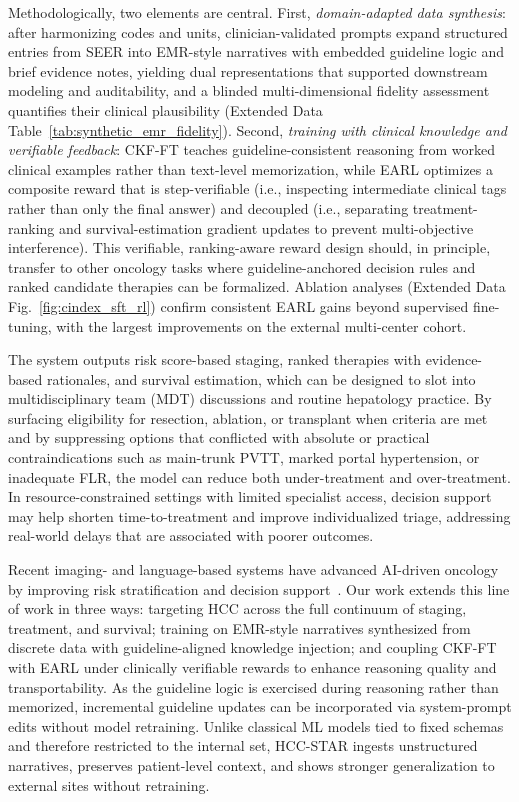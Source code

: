 \documentclass{article}
\begin{document}
Methodologically, two elements are central. First, \emph{domain-adapted data synthesis}: after harmonizing codes and units, clinician-validated prompts expand structured entries from SEER into EMR-style narratives with embedded guideline logic and brief evidence notes, yielding dual representations that supported downstream modeling and auditability, and a blinded multi-dimensional fidelity assessment quantifies their clinical plausibility (Extended Data Table~\ref{tab:synthetic_emr_fidelity}). Second, \emph{training with clinical knowledge and verifiable feedback}: CKF-FT teaches guideline-consistent reasoning from worked clinical examples rather than text-level memorization, while EARL optimizes a composite reward that is step-verifiable (i.e., inspecting intermediate clinical tags rather than only the final answer) and decoupled (i.e., separating treatment-ranking and survival-estimation gradient updates to prevent multi-objective interference). This verifiable, ranking-aware reward design should, in principle, transfer to other oncology tasks where guideline-anchored decision rules and ranked candidate therapies can be formalized. Ablation analyses (Extended Data Fig.~\ref{fig:cindex_sft_rl}) confirm consistent EARL gains beyond supervised fine-tuning, with the largest improvements on the external multi-center cohort.

The system outputs risk score-based staging, ranked therapies with evidence-based rationales, and survival estimation, which can be designed to slot into multidisciplinary team (MDT) discussions and routine hepatology practice. By surfacing eligibility for resection, ablation, or transplant when criteria are met and by suppressing options that conflicted with absolute or practical contraindications such as main-trunk PVTT, marked portal hypertension, or inadequate FLR, the model can reduce both under-treatment and over-treatment. In resource-constrained settings with limited specialist access, decision support may help shorten time-to-treatment and improve individualized triage, addressing real-world delays that are associated with poorer outcomes.

Recent imaging- and language-based systems have advanced AI-driven oncology by improving risk stratification and decision support~\cite{xiang_visionlanguage_2025,HEROVision,Menglei}. Our work extends this line of work in three ways: targeting HCC across the full continuum of staging, treatment, and survival; training on EMR-style narratives synthesized from discrete data with guideline-aligned knowledge injection; and coupling CKF-FT with EARL under clinically verifiable rewards to enhance reasoning quality and transportability. As the guideline logic is exercised during reasoning rather than memorized, incremental guideline updates can be incorporated via system-prompt edits without model retraining. Unlike classical ML models tied to fixed schemas and therefore restricted to the internal set, HCC-STAR ingests unstructured narratives, preserves patient-level context, and shows stronger generalization to external sites without retraining.
\end{document}
